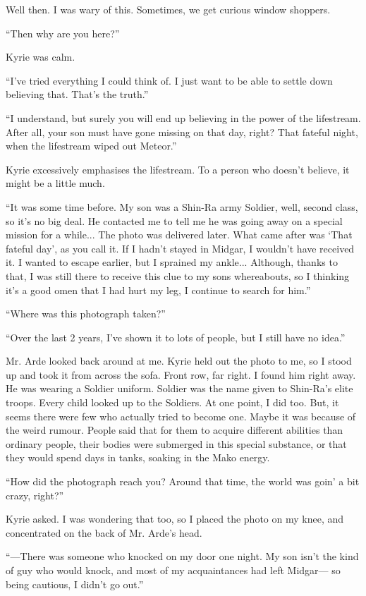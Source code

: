 \documentclass[oneside]{book}
\begin{document}
Well then. I was wary of this. Sometimes, we get curious window shoppers.

“Then why are you here?”

Kyrie was calm.

“I’ve tried everything I could think of. I just want to be able to settle down believing that. That’s the truth.”

“I understand, but surely you will end up believing in the power of the lifestream. After all, your son must have gone missing on that day, right? That fateful night, when the lifestream wiped out Meteor.”

Kyrie excessively emphasises the lifestream. To a person who doesn’t believe, it might be a little much.

“It was some time before. My son was a Shin-Ra army Soldier, well, second class, so it’s no big deal. He contacted me to tell me he was going away on a special mission for a while... The photo was delivered later. What came after was ‘That fateful day’, as you call it. If I hadn’t stayed in Midgar, I wouldn’t have received it. I wanted to escape earlier, but I sprained my ankle... Although, thanks to that, I was still there to receive this clue to my sons whereabouts, so I thinking it’s a good omen that I had hurt my leg, I continue to search for him.”

“Where was this photograph taken?”

“Over the last 2 years, I’ve shown it to lots of people, but I still have no idea.”

Mr. Arde looked back around at me. Kyrie held out the photo to me, so I stood up and took it from across the sofa. Front row, far right. I found him right away. He was wearing a Soldier uniform. Soldier was the name given to Shin-Ra’s elite troops. Every child looked up to the Soldiers. At one point, I did too. But, it seems there were few who actually tried to become one. Maybe it was because of the weird rumour. People said that for them to acquire different abilities than ordinary people, their bodies were submerged in this special substance, or that they would spend days in tanks, soaking in the Mako energy.

“How did the photograph reach you? Around that time, the world was goin’ a bit crazy, right?”

Kyrie asked. I was wondering that too, so I placed the photo on my knee, and concentrated on the back of Mr. Arde’s head.

“—There was someone who knocked on my door one night. My son isn’t the kind of guy who would knock, and most of my acquaintances had left Midgar— so being cautious, I didn’t go out.”
\end{document}
